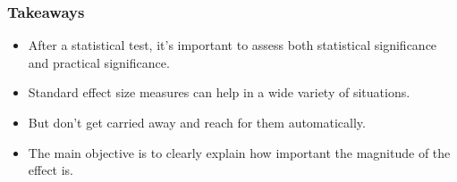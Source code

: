 \documentclass[12pt, block=fill]{beamer}
\begin{document}
\begin{frame}
  \frametitle{Takeaways}
  \begin{itemize}
  \item  After a statistical test, it's important to assess both
    statistical significance and practical significance.
  \item Standard effect size measures can help in a wide variety of situations.
  \item But don't get carried away and reach for them automatically.
  \item The main objective is to clearly explain how important the
    magnitude of the effect is.
  \end{itemize}
\end{frame}
\end{document}
